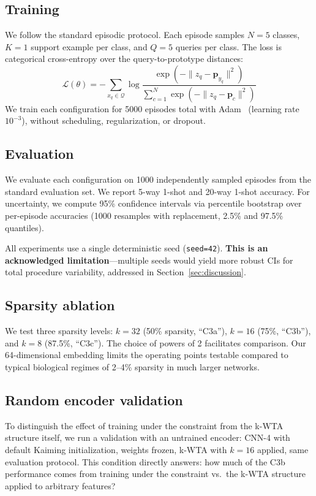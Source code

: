 \documentclass[11pt]{article}
\begin{document}
\subsection{Training}

We follow the standard episodic protocol. Each episode samples $N=5$ classes, $K=1$ support example per class, and $Q=5$ queries per class. The loss is categorical cross-entropy over the query-to-prototype distances:
\begin{equation}
\mathcal{L}(\theta) = -\sum_{x_q \in \mathcal{Q}} \log \frac{\exp(-\|z_q - \mathbf{p}_{y_q}\|^2)}{\sum_{c=1}^{N} \exp(-\|z_q - \mathbf{p}_c\|^2)}
\end{equation}
We train each configuration for 5000 episodes total with Adam~\citep{kingma2015adam} (learning rate $10^{-3}$), without scheduling, regularization, or dropout.

\subsection{Evaluation}

We evaluate each configuration on 1000 independently sampled episodes from the standard evaluation set. We report 5-way 1-shot and 20-way 1-shot accuracy. For uncertainty, we compute 95\% confidence intervals via percentile bootstrap over per-episode accuracies (1000 resamples with replacement, 2.5\% and 97.5\% quantiles).

All experiments use a single deterministic seed (\texttt{seed=42}). \textbf{This is an acknowledged limitation}---multiple seeds would yield more robust CIs for total procedure variability, addressed in Section~\ref{sec:discussion}.

\subsection{Sparsity ablation}

We test three sparsity levels: $k=32$ (50\% sparsity, ``C3a''), $k=16$ (75\%, ``C3b''), and $k=8$ (87.5\%, ``C3c''). The choice of powers of 2 facilitates comparison. Our 64-dimensional embedding limits the operating points testable compared to typical biological regimes of 2--4\% sparsity in much larger networks.

\subsection{Random encoder validation}

To distinguish the effect of training under the constraint from the k-WTA structure itself, we run a validation with an untrained encoder: CNN-4 with default Kaiming initialization, weights frozen, k-WTA with $k=16$ applied, same evaluation protocol. This condition directly answers: how much of the C3b performance comes from training under the constraint vs.\ the k-WTA structure applied to arbitrary features?
\end{document}
